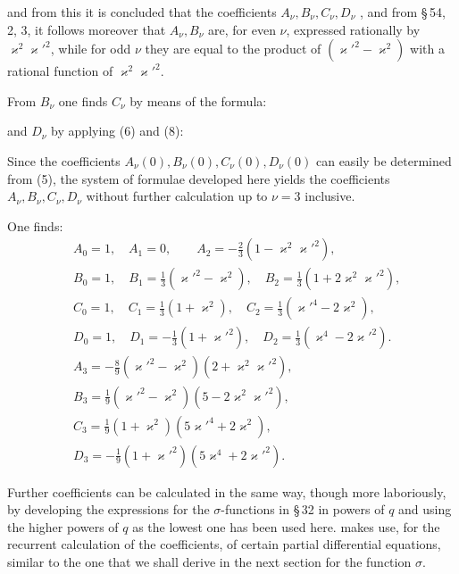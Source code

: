 
and from this it is concluded that the coefficients $A_\nu, B_\nu, C_\nu, D_\nu$
, and
from \S\,54, 2, 3, it follows moreover that $A_\nu, B_\nu$ are, for even $\nu$,
expressed rationally by $\varkappa^2\varkappa'^2$, while for odd
$\nu$ they are equal to the product of $(\varkappa'^2-\varkappa^2)$ with a rational function
 of $\varkappa^2\varkappa'^2$.

From $B_\nu$ one finds $C_\nu$ by means of the formula:


and $D_\nu$ by applying (6) and (8):


Since the coefficients $A_\nu(0), B_\nu(0), C_\nu(0), D_\nu(0)$ can easily be
determined from (5), the system of formulae developed here yields
the coefficients $A_\nu, B_\nu, C_\nu, D_\nu$ without
further calculation up to $\nu=3$ inclusive.

One finds:
\[
\begin{aligned}
&A_0=1, \quad A_1=0, \qquad A_2=-\frac{2}{3}(1-\varkappa^2\varkappa'^2),\\
&B_0=1, \quad B_1=\frac{1}{3}(\varkappa'^2-\varkappa^2), \quad B_2=\frac{1}{3}(1+2\varkappa^2\varkappa'^2),\\
&C_0=1, \quad C_1=\frac{1}{3}(1+\varkappa^2), \quad C_2=\frac{1}{3}(\varkappa'^4-2\varkappa^2),\\
&D_0=1, \quad D_1=-\frac{1}{3}(1+\varkappa'^2), \quad D_2=\frac{1}{3}(\varkappa^4-2\varkappa'^2).\\
&A_3=-\frac{8}{9}(\varkappa'^2-\varkappa^2)(2+\varkappa^2\varkappa'^2),\\
&B_3=\frac{1}{9}(\varkappa'^2-\varkappa^2)(5-2\varkappa^2\varkappa'^2),\\
&C_3=\frac{1}{9}(1+\varkappa^2)(5\varkappa'^4+2\varkappa^2),\\
&D_3=-\frac{1}{9}(1+\varkappa'^2)(5\varkappa^4+2\varkappa'^2).
\end{aligned}
\]

Further coefficients can be calculated in the same way, though
more laboriously, by developing the expressions for the
$\sigma$-functions in \S\,32 in powers of $q$ and using the higher
powers of $q$ as the lowest one has been used here. 
makes use, for the recurrent calculation of the coefficients,
of certain partial differential equations, similar to the one that we
shall derive in the next section for the function $\sigma$.

